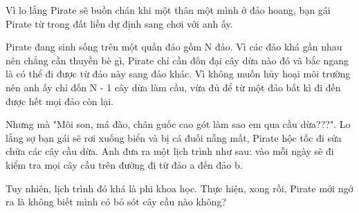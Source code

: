 Vì lo lắng Pirate sẽ buồn chán khi một thân một mình ở đảo hoang, bạn gái Pirate từ trong đất liền dự định sang chơi với anh ấy.  

   Pirate đang sinh sống trên một quần đảo gồm N đảo. Vì các đảo khá gần nhau nên chẳng cần thuyền bè gì, Pirate chỉ cần đốn đại cây dừa nào đó và bắc ngang là có thể đi được từ đảo này sang đảo khác. Vì không muốn hủy hoại môi trường nên anh ấy chỉ đốn N - 1 cây dừa làm cầu, vừa đủ để từ một đảo bất kì đi đến được hết mọi đảo còn lại.  

   Nhưng mà "Môi son, má đào, chân guốc cao gót làm sao em qua cầu dừa???". Lo lắng sợ bạn gái sẽ rơi xuống biển và bị cá đuối nẫng mất, Pirate hộc tốc đi sửa chữa các cây cầu dừa. Anh đưa ra một lịch trình như sau: vào mỗi ngày sẽ đi kiểm tra mọi cây cầu trên đường đi từ đảo a đến đảo b.  

   Tuy nhiên, lịch trình đó khá là phi khoa học. Thực hiện, xong rồi, Pirate mới ngớ ra là không biết mình có bỏ sót cây cầu nào không?